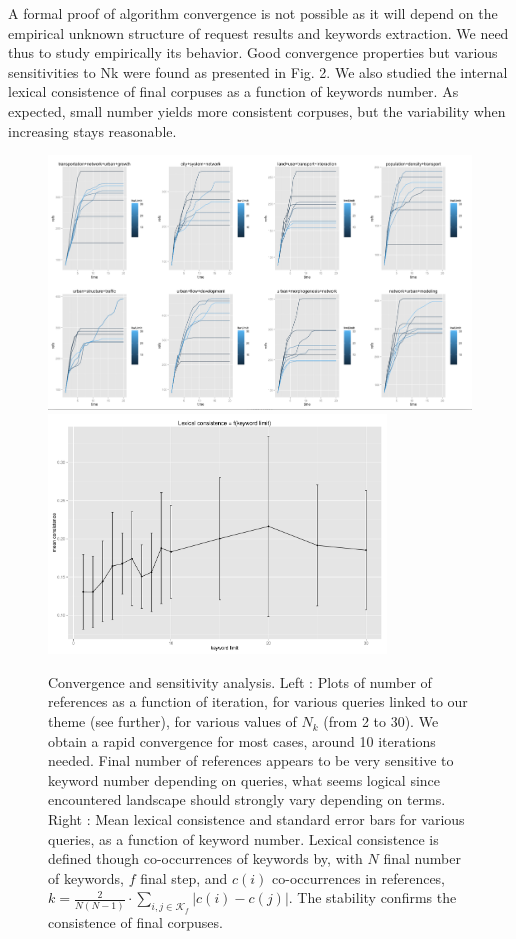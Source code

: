 A formal proof of algorithm convergence is not possible as it will depend on the empirical unknown structure of request results and keywords extraction. We need thus to study empirically its behavior. Good convergence properties but various sensitivities to Nk were found as presented in Fig. 2. We also studied the internal lexical consistence of final corpuses as a function of keywords number. As expected, small number yields more consistent corpuses, but the variability when increasing stays reasonable.


\begin{figure}
\centering
\includegraphics[width=\textwidth]{Figures/PartI/QuantitativeEpistemo/explo}
\medskip
\includegraphics[width=0.8\textwidth]{Figures/PartI/QuantitativeEpistemo/lexicalConsistence_MeanSd}
\caption[Convergence and sensitivity analysis of systematic review algorithm]{Convergence and sensitivity analysis. Left : Plots of number of references as a function of iteration, for various queries linked to our theme (see further), for various values of $N_k$ (from 2 to 30). We obtain a rapid convergence for most cases, around 10 iterations needed. Final number of references appears to be very sensitive to keyword number depending on queries, what seems logical since encountered landscape should strongly vary depending on terms. Right : Mean lexical consistence and standard error bars for various queries, as a function of keyword number. Lexical consistence is defined though co-occurrences of keywords by, with $N$ final number of keywords, $f$ final step, and $c(i)$ co-occurrences in references, $k = \frac{2}{N(N-1)}\cdot \sum_{i,j \in \mathcal{K}_f}{\left| c(i) - c(j) \right|}$. The stability confirms the consistence of final corpuses.}
\label{fig:quantepistemo:sensitivity}
\end{figure}
